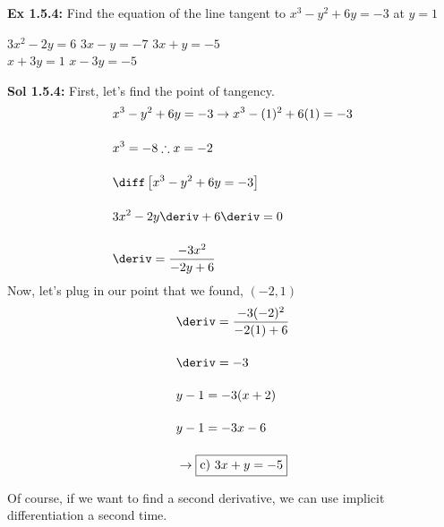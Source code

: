 \begin{tcolorbox}[example]
    \textbf{Ex 1.5.4: } Find the equation of the line tangent to $x^3 - y^2 + 6y = -3$ at $y = 1$ \\

    \begin{oneparchoices}
        \choice $3x^2 - 2y = 6$ 
        \choice $3x - y = -7$
        \choice $3x + y = -5$ \\[11pt]
        \makebox[0.25\textwidth] \choice $x + 3y = 1$
        \makebox[0.27\textwidth] \choice $x - 3y = -5$
    \end{oneparchoices}
\end{tcolorbox}
\begin{tcolorbox}[solution]
    \textbf{Sol 1.5.4: } First, let's find the point of tangency. \begin{align*}
        & x^3 - y^2 + 6y = -3 \rightarrow x^3 - (1)^2 + 6(1) = -3 \\[11pt]
        & x^3 = -8 \therefore x = -2 \\[11pt]
        & \diff \left[x^3 - y^2 + 6y = -3\right] \\[11pt]
        & 3x^2 - 2y\deriv + 6\deriv = 0 \\[11pt]
        & \deriv = \dfrac{-3x^2}{-2y + 6}
    \end{align*}
    Now, let's plug in our point that we found, $(-2, 1)$ \begin{align*}
        & \deriv = \dfrac{-3(-2)^2}{-2(1) + 6} \\[11pt]
        & \deriv = -3 \\[11pt]
        & y - 1 = -3(x + 2) \\[11pt]
        & y - 1 = -3x - 6 \\[11pt]
        & \rightarrow \boxed{\text{c) } 3x + y = -5}
    \end{align*}
\end{tcolorbox}

Of course, if we want to find a second derivative, we can use implicit differentiation a second time. \par 

